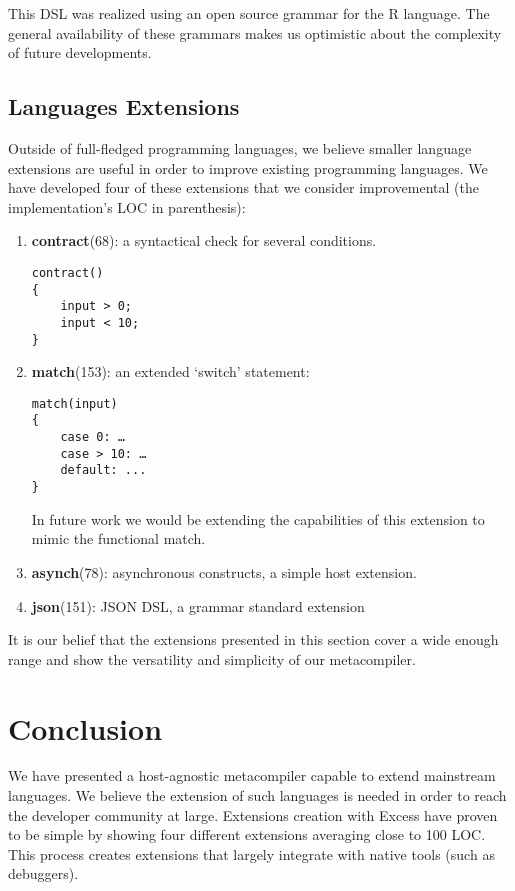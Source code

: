 \documentclass[conference]{IEEEtran}
\begin{document}
This DSL was realized using an open source grammar for the R language. The general availability of these grammars makes us optimistic about  the complexity of future developments.

\subsection{Languages Extensions}

Outside of full-fledged programming languages, we believe smaller language extensions are useful in order to improve existing programming languages.
We have developed four of these extensions that we consider improvemental (the implementation's LOC in parenthesis): 

\begin{enumerate}
   \item \textbf{contract}(68): a syntactical check for several conditions. 
	\begin{lstlisting}[basicstyle=\small]
contract()
{
    input > 0;
    input < 10;
}
	\end{lstlisting} 
   \item \textbf{match}(153): an extended `switch' statement:
	\begin{lstlisting}[basicstyle=\small]
match(input)
{
    case 0: …
    case > 10: …
    default: ...
}
	\end{lstlisting}

In future work we would be extending the capabilities of this extension to mimic the functional match. \\
   \item \textbf{asynch}(78): asynchronous constructs, a simple host extension.\\
   \item \textbf{json}(151): JSON DSL, a grammar standard extension
 \end{enumerate}

It is our belief that the extensions presented in this section cover a wide enough range and show the versatility and simplicity of our metacompiler.

\section{Conclusion}
We have presented a host-agnostic metacompiler capable to extend mainstream languages. We believe the extension of such languages
is needed in order to reach the developer community at large. Extensions creation with Excess have proven to be simple by showing four different extensions 
averaging close to 100 LOC. This process creates extensions that largely integrate with native tools (such as debuggers).
\end{document}
